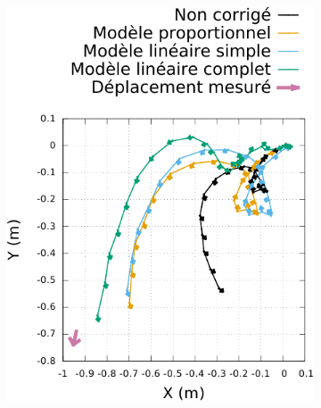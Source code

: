 \begin{figure}[htb]
    \centerfloat
    \begin{subfigure}{0.28\paperwidth}
        \centering
        \includegraphics[type=pdf,ext=.pdf,read=.pdf,width=1.0\linewidth]{../plot/OdometryCMAES/ordersTraj1}
    \end{subfigure}
    \begin{subfigure}{0.28\paperwidth}
        \centering

\end{subfigure}
\end{figure}
